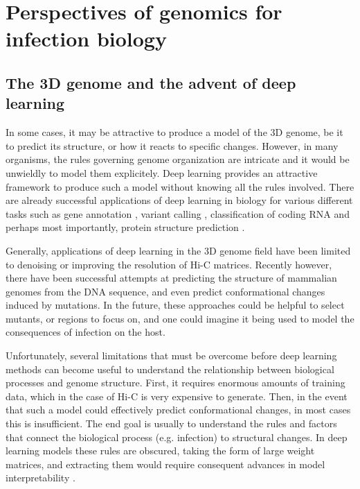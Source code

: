 
\chapter{Perspectives of genomics for infection biology} %

\label{ch:03-02} %


\section{The 3D genome and the advent of deep learning}
In some cases, it may be attractive to produce a model of the 3D genome, be it to predict its structure, or how it reacts to specific changes. However, in many organisms, the rules governing genome organization are intricate and it would be unwieldly to model them explicitely. Deep learning provides an attractive framework to produce such a model without knowing all the rules involved. There are already successful applications of deep learning in biology for various different tasks such as gene annotation \cite{stiehlerHelixerCrossspeciesGene2020}, variant calling \cite{poplinUniversalSNPSmallindel2018}, classification of coding RNA \cite{hillDeepRecurrentNeural2018} and perhaps most importantly, protein structure prediction \cite{jumperHighlyAccurateProtein2021}.

Generally, applications of deep learning in the 3D genome field have been limited to denoising or improving the resolution of Hi-C matrices. Recently however, there have been successful attempts at predicting the structure of mammalian genomes from the DNA sequence, and even predict conformational changes induced by mutations. In the future, these approaches could be helpful to select mutants, or regions to focus on, and one could imagine it being used to model the consequences of infection on the host.

Unfortunately, several limitations that must be overcome before deep learning methods can become useful to understand the relationship between biological processes and genome structure. First, it requires enormous amounts of training data, which in the case of Hi-C is very expensive to generate. Then, in the event that such a model could effectively predict conformational changes, in most cases this is insufficient. The end goal is usually to understand the rules and factors that connect the biological process (e.g. infection) to structural changes. In deep learning models these rules are obscured, taking the form of large weight matrices, and extracting them would require consequent advances in model interpretability \cite{talukderInterpretationDeepLearning2021}.
